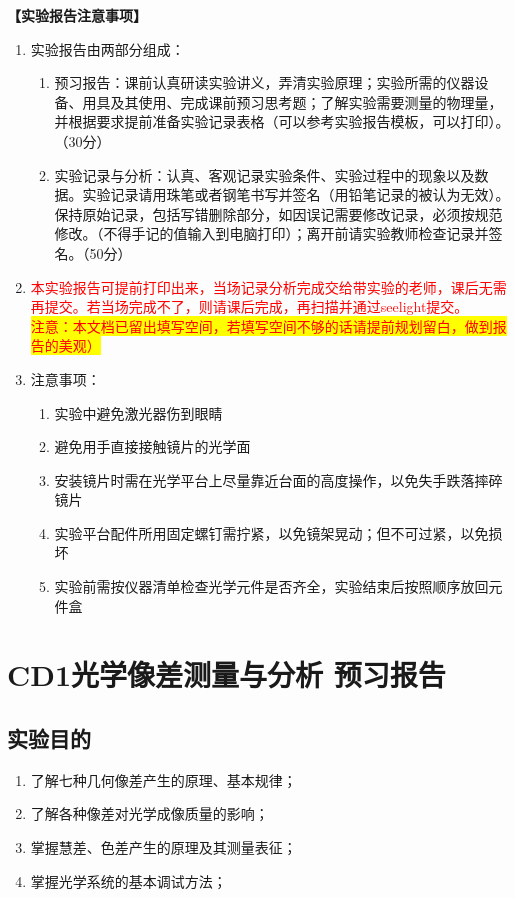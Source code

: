 \documentclass[dvipsnames, svgnames,a4paper,11pt]{article}
\begin{document}
	\textbf{【实验报告注意事项】}
	\begin{enumerate}
		\item 实验报告由两部分组成：
		\begin{enumerate}
			\item 预习报告：课前认真研读实验讲义，弄清实验原理；实验所需的仪器设备、用具及其使用、完成课前预习思考题；了解实验需要测量的物理量，并根据要求提前准备实验记录表格（可以参考实验报告模板，可以打印）。（30分）
			\item 实验记录与分析：认真、客观记录实验条件、实验过程中的现象以及数据。实验记录请用珠笔或者钢笔书写并签名（用铅笔记录的被认为无效）。保持原始记录，包括写错删除部分，如因误记需要修改记录，必须按规范修改。（不得手记的值输入到电脑打印）；离开前请实验教师检查记录并签名。（50分）
		\end{enumerate}
		
		\item\textcolor{red}{ 本实验报告可提前打印出来，当场记录分析完成交给带实验的老师，课后无需再提交。若当场完成不了，则请课后完成，再扫描并通过seelight提交。}\\
		\textcolor{red}{\colorbox{yellow}{注意：本文档已留出填写空间，若填写空间不够的话请提前规划留白，做到报告的美观）}}
		\item 注意事项：
		\begin{enumerate}
			\item 实验中避免激光器伤到眼睛
			\item 避免用手直接接触镜片的光学面
			\item 安装镜片时需在光学平台上尽量靠近台面的高度操作，以免失手跌落摔碎镜片
			\item 实验平台配件所用固定螺钉需拧紧，以免镜架晃动；但不可过紧，以免损坏
			\item 实验前需按仪器清单检查光学元件是否齐全，实验结束后按照顺序放回元件盒
		\end{enumerate}
		
		\end{enumerate}
	
	
	\clearpage
	\tableofcontents
	\clearpage
	
	
	
	
	\setcounter{section}{0}
	\section{CD1\quad 光学像差测量与分析 \heiti 预习报告}
	
	\subsection{实验目的}
	\begin{enumerate}
		\item 了解七种几何像差产生的原理、基本规律；
		\item 了解各种像差对光学成像质量的影响；
		\item 掌握慧差、色差产生的原理及其测量表征；
		\item 掌握光学系统的基本调试方法；
	\end{enumerate}
	
\end{document}
